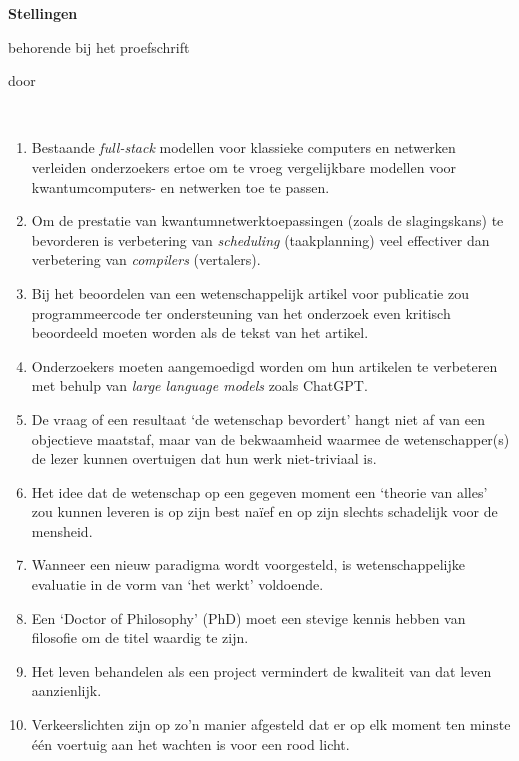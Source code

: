 \begin{center}

{\Large\titlefont\bfseries Stellingen}

\medskip

behorende bij het proefschrift

\medskip

{\makeatletter
\titlestyle\bfseries\large\@title
\makeatother}

{\makeatletter
\ifx\@subtitle\undefined\else
\titlefont\titleshape\@subtitle
\fi
\makeatother}

\medskip

door

\medskip

\makeatletter
{\large\titlefont\bfseries\@firstname\ {\titleshape\@lastname}}
\makeatother

\end{center}

\bigskip

\begin{enumerate}[widest=10]
    \item Bestaande \textit{full-stack} modellen voor klassieke computers en netwerken verleiden onderzoekers ertoe om te vroeg vergelijkbare modellen voor kwantumcomputers- en netwerken toe te passen.
    \item Om de prestatie van kwantumnetwerktoepassingen (zoals de slagingskans) te bevorderen is verbetering van \textit{scheduling} (taakplanning) veel effectiver dan verbetering van \textit{compilers} (vertalers).

    \item Bij het beoordelen van een wetenschappelijk artikel voor publicatie zou programmeercode ter ondersteuning van het onderzoek even kritisch beoordeeld moeten worden als de tekst van het artikel.
    \item Onderzoekers moeten aangemoedigd worden om hun artikelen te verbeteren met behulp van \textit{large language models} zoals ChatGPT.
    \item De vraag of een resultaat `de wetenschap bevordert' hangt niet af van een objectieve maatstaf, maar van de bekwaamheid waarmee de wetenschapper(s) de lezer kunnen overtuigen dat hun werk niet-triviaal is.
    \item Het idee dat de wetenschap op een gegeven moment een `theorie van alles' zou kunnen leveren is op zijn best naïef en op zijn slechts schadelijk voor de mensheid.
    \item Wanneer een nieuw paradigma wordt voorgesteld, is wetenschappelijke evaluatie in de vorm van `het werkt' voldoende.
    \item Een `Doctor of Philosophy' (PhD) moet een stevige kennis hebben van filosofie om de titel waardig te zijn.
    \item Het leven behandelen als een project vermindert de kwaliteit van dat leven aanzienlijk.
    \item Verkeerslichten zijn op zo'n manier afgesteld dat er op elk moment ten minste één voertuig aan het wachten is voor een rood licht.
\end{enumerate}

